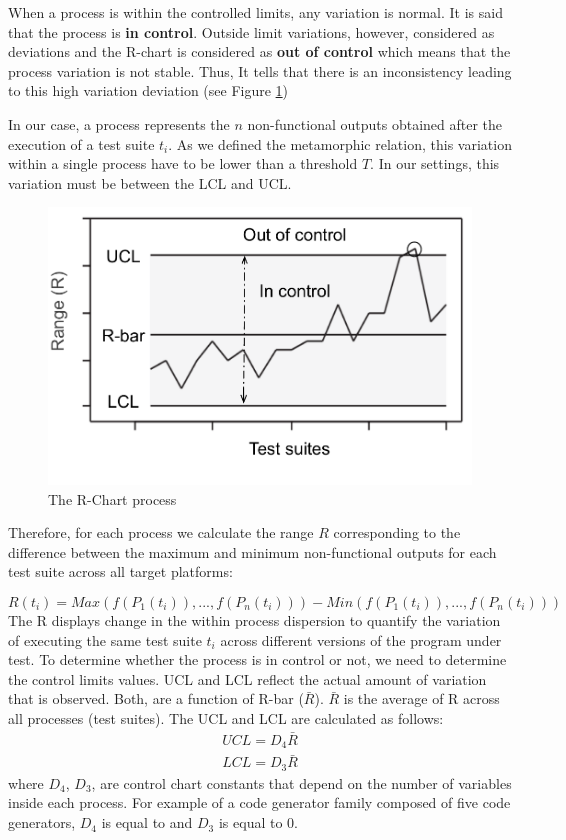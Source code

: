 When a process is within the controlled limits, any variation is normal. It is said that the process is \textbf{in control}. 
Outside limit variations, however, considered as deviations and the R-chart is considered as \textbf{out of control} which means that the process variation is not stable. Thus, It tells that there is an inconsistency leading to this high variation deviation (see Figure \ref{fig:cg-rechart})

In our case, a process represents the $n$ non-functional outputs obtained after the execution of a test suite $t_{i}$. As we defined the metamorphic relation, this variation within a single process have to be lower than a threshold $T$. In our settings, this variation must be between the LCL and UCL.

\begin{figure}[h]
	\centering
	\includegraphics[width=0.6\linewidth]{chapitre4/fig/rchat}
	\caption{The R-Chart process}
	\label{fig:cg-rechart}
\end{figure}

Therefore, for each process we calculate the range $R$ corresponding to the difference between the maximum and minimum non-functional outputs for each test suite across all target platforms:

\begin{equation}
R(t_{i})= Max(f(P_{1}(t_{i})),..., f(P_{n}(t_{i}))) - Min(f(P_{1}(t_{i})),..., f(P_{n}(t_{i})))  
\end{equation}
The R displays change in the within process dispersion to quantify the variation of executing the same test suite $t_{i}$ across different versions of the program under test.
To determine whether the process is in control or not, we need to determine the control limits values. UCL and LCL reflect the actual amount of variation that is observed. Both, are a function of R-bar ($\bar{R}$). $\bar{R}$ is the average of R across all processes (test suites).
The UCL and LCL are calculated as follows:
\begin{equation}
\begin{split} 
UCL = D_{4}\bar{R}\\
LCL = D_{3}\bar{R}
\end{split} 
\label{eqUCL}
\end{equation}
where $D_{4}$, $D_{3}$, are control chart constants that depend on the number of variables inside each process. For example of a code generator family composed of five code generators, $D_{4}$ is equal to and $D_{3}$ is equal to 0. 

